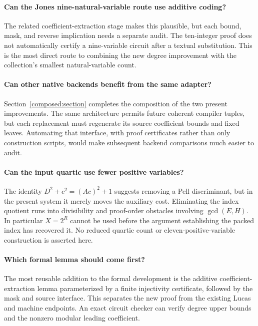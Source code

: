 \documentclass[11pt,a4paper]{article}
\theoremstyle{definition}
\begin{document}
\paragraph{Can the Jones nine-natural-variable route use additive coding?}
The related coefficient-extraction stage makes this plausible,
but each bound, mask, and reverse implication needs a separate
audit. The ten-integer proof does not automatically certify a
nine-variable circuit after a textual substitution. This is the
most direct route to combining the new degree improvement with
the collection's smallest natural-variable count.

\paragraph{Can other native backends benefit from the same adapter?}
Section~\ref{composed:section} completes the composition of the two
present improvements. The same architecture permits future coherent
compiler tuples, but each replacement must regenerate its source
coefficient bounds and fixed leaves. Automating that interface,
with proof certificates rather than only construction scripts,
would make subsequent backend comparisons much easier to audit.

\paragraph{Can the input quartic use fewer positive variables?}
The identity $D^2+c^2=(Ac)^2+1$ suggests removing a Pell
discriminant, but in the present system it merely moves the
auxiliary cost. Eliminating the index quotient runs into
divisibility and proof-order obstacles involving
$\gcd(E,H)$. In particular $X=2^R$ cannot be used before the
argument establishing the packed index has recovered it.
No reduced quartic count or eleven-positive-variable construction
is asserted here.

\paragraph{Which formal lemma should come first?}
The most reusable addition to the formal development is the
additive coefficient-extraction lemma parameterized by a finite
injectivity certificate, followed by the mask and source
interface. This separates the new proof from the existing
Lucas and machine endpoints. An exact circuit checker can
verify degree upper bounds and the nonzero modular
leading coefficient.
\end{document}
